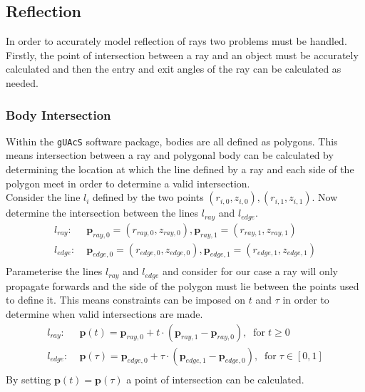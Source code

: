 \documentclass{article}
\begin{document}
\subsection{Reflection}
In order to accurately model reflection of rays two problems must be handled. Firstly, the point of intersection between a ray and an object must be accurately calculated and then the entry and exit angles of the ray can be calculated as needed.

\subsubsection{Body Intersection}
Within the \texttt{gUAcS} software package, bodies are all defined as polygons. This means intersection between a ray and polygonal body can be calculated by determining the location at which the line defined by a ray and each side of the polygon meet in order to determine a valid intersection.
\\
Consider the line $l_i$ defined by the two points $(r_{i, 0}, z_{i, 0}), (r_{i, 1}, z_{i, 1})$. Now determine the intersection between the lines $l_{ray}$ and $l_{edge}$.
\begin{align*}
	l_{ray}:  & \; \bm{p}_{ray, 0}=(r_{ray, 0}, z_{ray, 0}), \bm{p}_{ray, 1}=(r_{ray, 1}, z_{ray, 1})       \\
	l_{edge}: & \; \bm{p}_{edge, 0}=(r_{edge, 0}, z_{edge, 0}), \bm{p}_{edge, 1}=(r_{edge, 1}, z_{edge, 1}) \\
\end{align*}
Parameterise the lines $l_{ray}$ and $l_{edge}$ and consider for our case a ray will only propagate forwards and the side of the polygon must lie between the points used to define it. This means constraints can be imposed on $t$ and $\tau$ in order to determine when valid intersections are made.
\begin{align*}
	l_{ray}:  & \; \bm{p}(t)= \bm{p}_{ray, 0} + t\cdot(\bm{p}_{ray, 1} - \bm{p}_{ray, 0}),\;\;\mathrm{for}\;t\geq0                 \\
	l_{edge}: & \; \bm{p}(\tau)= \bm{p}_{edge, 0} + \tau\cdot(\bm{p}_{edge, 1} - \bm{p}_{edge, 0}),\;\;\mathrm{for}\;\tau\in[0, 1] \\
\end{align*}
By setting $\bm{p}(t)=\bm{p}(\tau)$ a point of intersection can be calculated.
\end{document}
